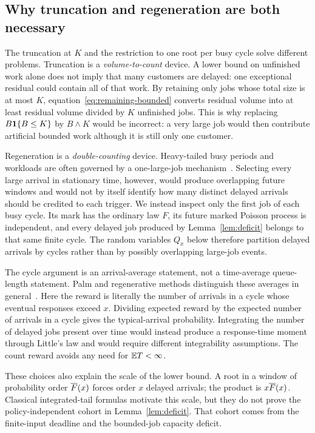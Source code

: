 \subsection{Why truncation and regeneration are both necessary}\label{sec:truncation-regeneration}
The truncation at $K$ and the restriction to one root per busy cycle solve different problems.  Truncation is a \emph{volume-to-count} device.  A lower bound on unfinished work alone does not imply that many customers are delayed: one exceptional residual could contain all of that work.  By retaining only jobs whose total size is at most $K$, equation~\eqref{eq:remaining-bounded} converts residual volume into at least residual volume divided by $K$ unfinished jobs.  This is why replacing $B\mathbf 1\{B\leq K\}$ by $B\wedge K$ would be incorrect: a very large job would then contribute artificial bounded work although it is still only one customer.

Regeneration is a \emph{double-counting} device.  Heavy-tailed busy periods and workloads are often governed by a one-large-job mechanism~\cite{zwart2001,abate1994,boxmadenisov2011}.  Selecting every large arrival in stationary time, however, would produce overlapping future windows and would not by itself identify how many distinct delayed arrivals should be credited to each trigger.  We instead inspect only the first job of each busy cycle.  Its mark has the ordinary law $F$, its future marked Poisson process is independent, and every delayed job produced by Lemma~\ref{lem:deficit} belongs to that same finite cycle.  The random variables $Q_x$ below therefore partition delayed arrivals by cycles rather than by possibly overlapping large-job events.

The cycle argument is an arrival-average statement, not a time-average queue-length statement.  Palm and regenerative methods distinguish these averages in general~\cite{baccelli2003,wolff1982}.  Here the reward is literally the number of arrivals in a cycle whose eventual responses exceed $x$.  Dividing expected reward by the expected number of arrivals in a cycle gives the typical-arrival probability.  Integrating the number of delayed jobs present over time would instead produce a response-time moment through Little's law and would require different integrability assumptions.  The count reward avoids any need for $\mathbb E T<\infty$.

These choices also explain the scale of the lower bound.  A root in a window of probability order $\overline F(x)$ forces order $x$ delayed arrivals; the product is $x\overline F(x)$.  Classical integrated-tail formulas motivate this scale, but they do not prove the policy-independent cohort in Lemma~\ref{lem:deficit}.  That cohort comes from the finite-input deadline and the bounded-job capacity deficit.

